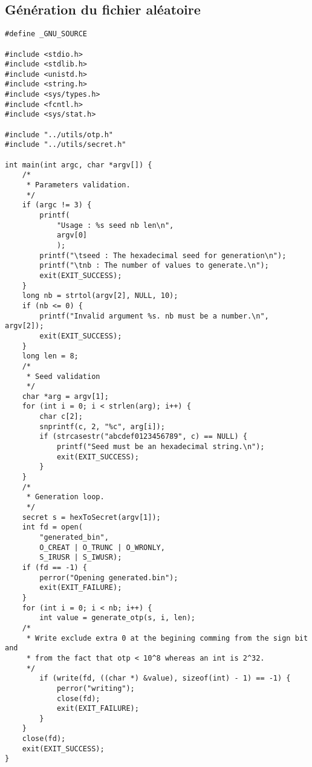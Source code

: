 \documentclass{"../../res/univ-projet"}
\begin{document}
	\newpage
	\begin{appendices}
	\chapter{Génération du fichier aléatoire}
		\lstset{language=C}
		\begin{lstlisting}
#define _GNU_SOURCE

#include <stdio.h>
#include <stdlib.h>
#include <unistd.h>
#include <string.h>
#include <sys/types.h>
#include <fcntl.h>
#include <sys/stat.h>

#include "../utils/otp.h"
#include "../utils/secret.h"

int main(int argc, char *argv[]) {
    /*
     * Parameters validation.
     */
    if (argc != 3) {
        printf(
            "Usage : %s seed nb len\n",
            argv[0]
            );
        printf("\tseed : The hexadecimal seed for generation\n");
        printf("\tnb : The number of values to generate.\n");
        exit(EXIT_SUCCESS);
    }
    long nb = strtol(argv[2], NULL, 10);
    if (nb <= 0) {
        printf("Invalid argument %s. nb must be a number.\n", argv[2]);
        exit(EXIT_SUCCESS);
    }
    long len = 8;
    /*
     * Seed validation
     */
    char *arg = argv[1];
    for (int i = 0; i < strlen(arg); i++) {
        char c[2];
        snprintf(c, 2, "%c", arg[i]);
        if (strcasestr("abcdef0123456789", c) == NULL) {
            printf("Seed must be an hexadecimal string.\n");
            exit(EXIT_SUCCESS);
        }
    }
    /*
     * Generation loop.
     */
    secret s = hexToSecret(argv[1]);
    int fd = open(
        "generated_bin",
        O_CREAT | O_TRUNC | O_WRONLY,
        S_IRUSR | S_IWUSR);
    if (fd == -1) {
        perror("Opening generated.bin");
        exit(EXIT_FAILURE);
    }
    for (int i = 0; i < nb; i++) {
        int value = generate_otp(s, i, len);
    /*
     * Write exclude extra 0 at the begining comming from the sign bit and
     * from the fact that otp < 10^8 whereas an int is 2^32.
     */
        if (write(fd, ((char *) &value), sizeof(int) - 1) == -1) {
            perror("writing");
            close(fd);
            exit(EXIT_FAILURE);
        }
    }
    close(fd);
    exit(EXIT_SUCCESS);
}
		\end{lstlisting}
	\end{appendices}  
  
\end{document}
